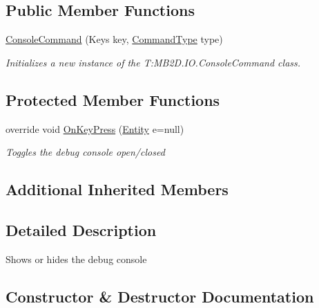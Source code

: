 \subsection*{Public Member Functions}
\begin{DoxyCompactItemize}
\item 
\hyperlink{class_m_b2_d_1_1_i_o_1_1_console_command_a20155e6305233ea1655d9475db692b26}{Console\+Command} (Keys key, \hyperlink{namespace_m_b2_d_1_1_i_o_ab5f95f3fe9e652778b62bdf943168a68}{Command\+Type} type)
\begin{DoxyCompactList}\small\item\em Initializes a new instance of the T\+:\+M\+B2\+D.\+I\+O.\+Console\+Command class. \end{DoxyCompactList}\end{DoxyCompactItemize}
\subsection*{Protected Member Functions}
\begin{DoxyCompactItemize}
\item 
override void \hyperlink{class_m_b2_d_1_1_i_o_1_1_console_command_ad46e036e534b3b1cd1503782042d358f}{On\+Key\+Press} (\hyperlink{class_m_b2_d_1_1_entity_component_1_1_entity}{Entity} e=null)
\begin{DoxyCompactList}\small\item\em Toggles the debug console open/closed \end{DoxyCompactList}\end{DoxyCompactItemize}
\subsection*{Additional Inherited Members}


\subsection{Detailed Description}
Shows or hides the debug console 



\subsection{Constructor \& Destructor Documentation}
\hypertarget{class_m_b2_d_1_1_i_o_1_1_console_command_a20155e6305233ea1655d9475db692b26}{}\label{class_m_b2_d_1_1_i_o_1_1_console_command_a20155e6305233ea1655d9475db692b26} 
